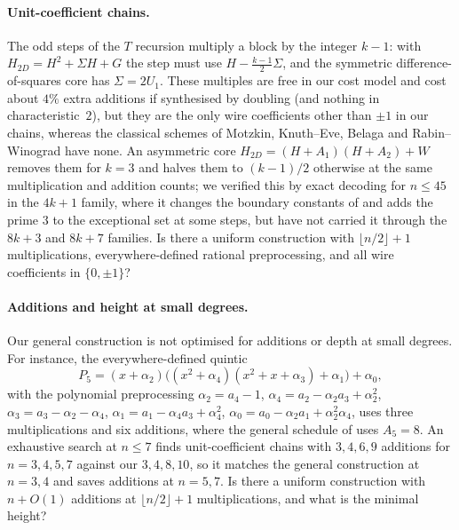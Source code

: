 \paragraph{Unit-coefficient chains.}
The odd steps of the $T$ recursion multiply a block by the integer $k-1$:
with $H_{2D}=H^2+\Sigma H+G$ the step must use $H-\tfrac{k-1}{2}\Sigma$, and
the symmetric difference-of-squares core has $\Sigma=2U_1$.  These multiples
are free in our cost model and cost about $4\%$ extra additions if
synthesised by doubling (and nothing in characteristic~$2$), but they are
the only wire coefficients other than $\pm1$ in our chains, whereas the
classical schemes of Motzkin, Knuth--Eve, Belaga and Rabin--Winograd have
none.  An asymmetric core $H_{2D}=(H+A_1)(H+A_2)+W$ removes them for $k=3$
and halves them to $(k-1)/2$ otherwise at the same multiplication and
addition counts; we verified this by exact decoding for $n\le45$ in the
$4k+1$ family, where it changes the boundary constants of 
and adds the prime $3$ to the exceptional set at some steps, but have not
carried it through the $8k+3$ and $8k+7$ families.  Is there a uniform
construction with $\lfloor n/2\rfloor+1$ multiplications, everywhere-defined
rational preprocessing, and all wire coefficients in $\{0,\pm1\}$?

\paragraph{Additions and height at small degrees.}
Our general construction is not optimised for additions or depth at small
degrees.  For instance, the everywhere-defined quintic
\[
 P_5=(x+\alpha_2)\bigl((x^2+\alpha_4)(x^2+x+\alpha_3)+\alpha_1\bigr)+\alpha_0,
\]
with the polynomial preprocessing $\alpha_2=a_4-1$,
$\alpha_4=a_2-\alpha_2a_3+\alpha_2^2$, $\alpha_3=a_3-\alpha_2-\alpha_4$,
$\alpha_1=a_1-\alpha_4a_3+\alpha_4^2$,
$\alpha_0=a_0-\alpha_2a_1+\alpha_2^2\alpha_4$, uses three multiplications and
six additions, where the general schedule of  uses
$A_5=8$.  An exhaustive search at $n\le7$ finds unit-coefficient chains with
$3,4,6,9$ additions for $n=3,4,5,7$ against our $3,4,8,10$, so it matches the
general construction at $n=3,4$ and saves additions at $n=5,7$.  Is there a
uniform construction with $n+O(1)$ additions at $\lfloor n/2\rfloor+1$
multiplications, and what is the minimal height?
